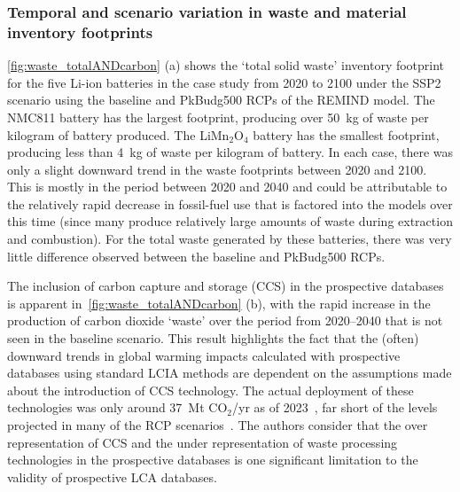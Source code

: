 \documentclass[a4paper,fleqn]{cas-dc}
\begin{document}
\subsubsection{Temporal and scenario variation in waste and material inventory footprints}

\autoref{fig:waste_totalANDcarbon} (a) shows the `total solid waste' inventory footprint for the five Li-ion batteries in the case study from 2020 to 2100 under the SSP2 scenario using the baseline and PkBudg500 RCPs of the REMIND model. The NMC811 battery has the largest footprint, producing over 50~kg of waste per kilogram of battery produced. The  LiMn\(_2\)O\(_4\) battery has the smallest footprint, producing less than 4~kg of waste per kilogram of battery. In each case, there was only a slight downward trend in the waste footprints between 2020 and 2100. This is mostly in the period between 2020 and 2040 and could be attributable to the relatively rapid decrease in fossil-fuel use that is factored into the models over this time (since many produce relatively large amounts of waste during extraction and combustion). For the total waste generated by these batteries, there was very little difference observed between the baseline and PkBudg500 RCPs.

The inclusion of carbon capture and storage (CCS) in the prospective databases is apparent in~\autoref{fig:waste_totalANDcarbon} (b), with the rapid increase in the production of carbon dioxide `waste' over the period from 2020--2040 that is not seen in the baseline scenario. This result highlights the fact that the (often) downward trends in global warming impacts calculated with prospective databases using standard LCIA methods are dependent on the assumptions made about the introduction of CCS technology. The actual deployment of these technologies was only around 37~Mt CO$_2$/yr as of 2023~\citep{dziejarski2023ccs}, far short of the levels projected in many of the RCP scenarios~\citep{sacchi2023premisedocs}. The authors consider that the over representation of CCS and the under representation of waste processing technologies in the prospective databases is one significant limitation to the validity of prospective LCA databases.
\end{document}
